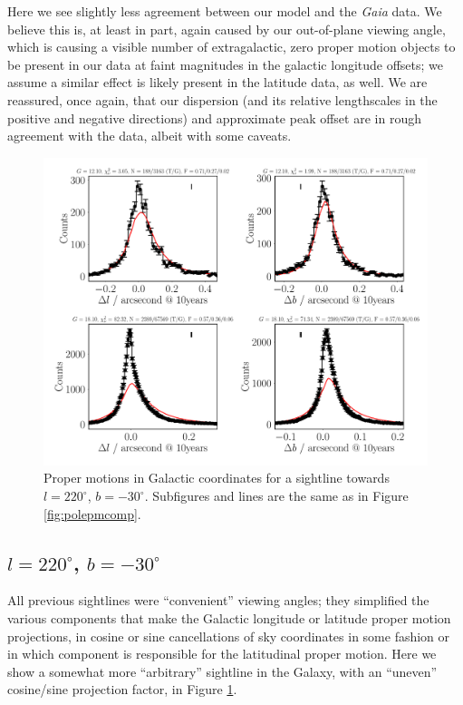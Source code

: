 \documentclass[fleqn,usenatbib]{mnras}
\begin{document}
Here we see slightly less agreement between our model and the \textit{Gaia} data.
We believe this is, at least in part, again caused by our out-of-plane viewing angle, which is causing a visible number of extragalactic, zero proper motion objects to be present in our data at faint magnitudes in the galactic longitude offsets; we assume a similar effect is likely present in the latitude data, as well.
We are reassured, once again, that our dispersion (and its relative lengthscales in the positive and negative directions) and approximate peak offset are in rough agreement with the data, albeit with some caveats.
\begin{figure}
    \centering
    \includegraphics[width=\columnwidth]{Plots/plots_pm_gaia_220_-30.pdf}
    \caption{Proper motions in Galactic coordinates for a sightline towards $l = 220^\circ$, $b = -30^\circ$.
    Subfigures and lines are the same as in Figure \ref{fig:polepmcomp}.}
    \label{fig:l220comp}
\end{figure}

\subsection{$l = 220^\circ$, $b = -30^\circ$}
All previous sightlines were ``convenient'' viewing angles; they simplified the various components that make the Galactic longitude or latitude proper motion projections, in cosine or sine cancellations of sky coordinates in some fashion or in which component is responsible for the latitudinal proper motion.
Here we show a somewhat more ``arbitrary'' sightline in the Galaxy, with an ``uneven'' cosine/sine projection factor, in Figure \ref{fig:l220comp}.
\end{document}
